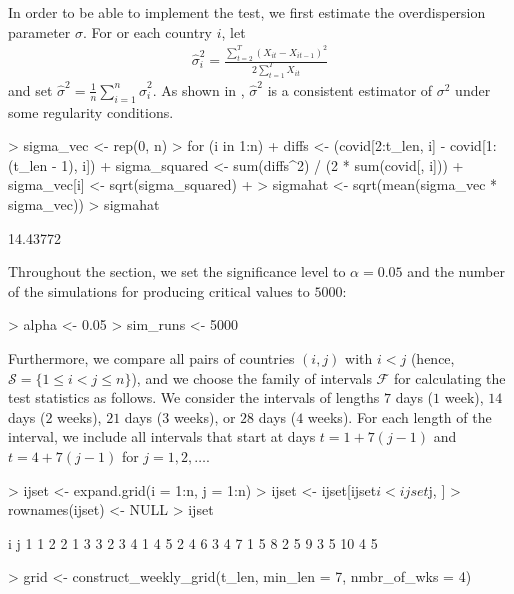 \documentclass[a4paper]{scrartcl}
\begin{document}
In order to be able to implement the test, we first estimate the overdispersion parameter $\sigma$. For or each country $i$, let 
\begin{align*}
\hat{\sigma}_i^2 = \frac{\sum_{t=2}^T (X_{it}-X_{it-1})^2}{2 \sum_{t=1}^T X_{it}}
\end{align*}
and set $\hat{\sigma}^2 = \frac{1}{n} \sum_{i=1}^n \hat{\sigma}_i^2$. As shown in \cite{KhismatullinaVogt2020b}, $\hat{\sigma}^2$ is a consistent estimator of $\sigma^2$ under some regularity conditions. 


\begin{Schunk}
\begin{Sinput}
> sigma_vec <- rep(0, n)
> for (i in 1:n){
+   diffs <- (covid[2:t_len, i] - covid[1:(t_len - 1), i])
+   sigma_squared <- sum(diffs^2) / (2 * sum(covid[, i]))
+   sigma_vec[i] <- sqrt(sigma_squared)
+ }
> sigmahat <- sqrt(mean(sigma_vec * sigma_vec))
> sigmahat
\end{Sinput}
\begin{Soutput}
[1] 14.43772
\end{Soutput}
\end{Schunk}

Throughout the section, we set the significance level to $\alpha=0.05$ and the number of the simulations for producing critical values to $5000$:

\begin{Schunk}
\begin{Sinput}
> alpha    <- 0.05
> sim_runs <- 5000
\end{Sinput}
\end{Schunk}

Furthermore, we compare all pairs of countries $(i,j)$ with $i < j$ (hence, $\mathcal{S} = \{1 \leq i < j \leq n\}$), and we choose the family of intervals $\mathcal{F}$ for calculating the test statistics as follows. We consider the intervals of lengths $7$ days ($1$ week), $14$ days ($2$ weeks), $21$ days ($3$ weeks), or $28$ days ($4$ weeks). For each length of the interval, we include all intervals that start at days $t = 1 + 7(j-1)$ and $t = 4 + 7(j-1)$ for $j=1,2,\ldots$.

\begin{Schunk}
\begin{Sinput}
> ijset           <- expand.grid(i = 1:n, j = 1:n)
> ijset           <- ijset[ijset$i < ijset$j, ]
> rownames(ijset) <- NULL
> ijset
\end{Sinput}
\begin{Soutput}
   i j
1  1 2
2  1 3
3  2 3
4  1 4
5  2 4
6  3 4
7  1 5
8  2 5
9  3 5
10 4 5
\end{Soutput}
\begin{Sinput}
> grid <- construct_weekly_grid(t_len, min_len = 7, nmbr_of_wks = 4) 
\end{Sinput}
\end{Schunk}
\end{document}
